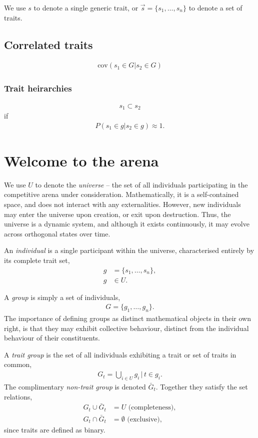 \documentclass[twocolumn, aps, rmp, amsmath, amssymb, nofootinbib, superscriptaddress, longbibliography, floatfix, table-of-contents, eqsecnum]{revtex4-1}
\begin{document}
We use $s$ to denote a single generic trait, or $\vec s=\{s_1,\dots,s_n\}$ to denote a set of traits.

\subsection{Correlated traits}

\begin{align}
\text{cov}(s_1\in G | s_2\in G)	
\end{align}

\subsubsection{Trait heirarchies}

\begin{align}
s_1 \subset s_2	
\end{align}
if
\begin{align}
P(s_1\in g | s_2\in g)\approx 1.	
\end{align}

\section{Welcome to the arena}

We use $U$ to denote the \textit{universe} -- the set of all individuals participating in the competitive arena under consideration. Mathematically, it is a self-contained space, and does not interact with any externalities. However, new individuals may enter the universe upon creation, or exit upon destruction. Thus, the universe is a dynamic system, and although it exists continuously, it may evolve across orthogonal states over time.

An \textit{individual} is a single participant within the universe, characterised entirely by its complete trait set,
\begin{align}
	g &= \{s_1,\dots,s_n\},\nonumber\\
	g &\in U.
\end{align}

A \textit{group} is simply a set of individuals,
\begin{align}
	G = \{g_1,\dots,g_n\}.	
\end{align}
The importance of defining groups as distinct mathematical objects in their own right, is that they may exhibit collective behaviour, distinct from the individual behaviour of their constituents.

A \textit{trait group} is the set of all individuals exhibiting a trait or set of traits in common,
\begin{align}
	G_t = \bigcup_{i\in U} g_i \,|\, t\in g_i.
\end{align}
The complimentary \textit{non-trait group} is denoted $\bar G_t$. Together they satisfy the set relations,
\begin{align}
G_t \cup \bar G_t &= U \,\,\text{(completeness)},\nonumber\\
G_t \cap \bar G_t &= \emptyset \,\,\text{(exclusive)},
\end{align}
since traits are defined as binary.
\end{document}
